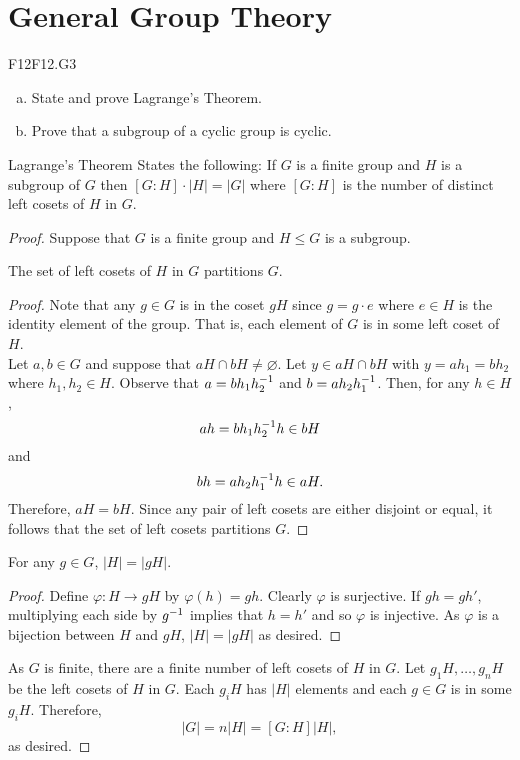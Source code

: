 \documentclass[../AlgebraQualSolutions.tex]{subfiles}
\begin{document}
\section{General Group Theory}

	\begin{prob}{F12}{F12.G3}
	\begin{enumerate}[(a)]
	\item State and prove Lagrange's Theorem.
	\item Prove that a subgroup of a cyclic group is cyclic.
	\end{enumerate}
	\end{prob}
	
	Lagrange's Theorem States the following: If $G$ is a finite group and $H$ is a subgroup of $G$ then $[G:H]\cdot|H| = |G|$ where $[G:H]$ is the number of distinct left cosets of $H$ in $G$.

	\begin{proof}
		Suppose that $G$ is a finite group and $H \leq G$ is a subgroup.

		\begin{claim}
			The set of left cosets of $H$ in $G$ partitions $G$.

			\begin{proof}
				Note that any $g \in G$ is in the coset $gH$ since $g = g\cdot e$ where $e \in H$ is the identity element of the group. That is, each element of $G$ is in some left coset of $H$.\\

				Let $a,b \in G$ and suppose that $aH \cap bH \neq \varnothing$. Let $y \in aH \cap bH$ with $y = ah_1 = bh_2$ where $h_1,h_2 \in H$. Observe that $a = bh_1h_2^{-1}$ and $b = ah_2h_1^{-1}$. Then, for any $h \in H$,
					\[ah = bh_1h_2^{-1} h \in bH \]
				and
					\[bh = ah_2h_1^{-1} h \in aH.\]
				Therefore, $aH = bH$. Since any pair of left cosets are either disjoint or equal, it follows that the set of left cosets partitions $G$.
			\end{proof}
		\end{claim}

		\begin{claim}
			For any $g \in G$, $|H| = |gH|$.

			\begin{proof}
				Define $\varphi: H \to gH$ by $\varphi(h) = gh$. Clearly $\varphi$ is surjective. If $gh = gh'$, multiplying each side by $g^{-1}$ implies that $h = h'$ and so $\varphi$ is injective. As $\varphi$ is a bijection between $H$ and $gH$, $|H| = |gH|$ as desired. 
			\end{proof}
		\end{claim}

		As $G$ is finite, there are a finite number of left cosets of $H$ in $G$. Let $g_1H, \ldots, g_nH$ be the left cosets of $H$ in $G$. Each $g_iH$ has $|H|$ elements and each $g \in G$ is in some $g_iH$. Therefore,
			\[|G| = n|H| = [G:H]|H|,\]
		as desired.
	\end{proof}
\end{document}
